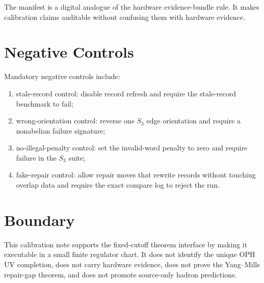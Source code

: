 \documentclass[11pt]{article}
\begin{document}
The manifest is a digital analogue of the hardware evidence-bundle rule. It makes calibration
claims auditable without confusing them with hardware evidence.

\section{Negative Controls}

Mandatory negative controls include:
\begin{enumerate}[leftmargin=2em]
\item stale-record control: disable record refresh and require the stale-record benchmark to fail;
\item wrong-orientation control: reverse one \(S_3\) edge orientation and require a nonabelian
failure signature;
\item no-illegal-penalty control: set the invalid-word penalty to zero and require failure in the
\(S_3\) suite;
\item fake-repair control: allow repair moves that rewrite records without touching overlap data
and require the exact compare log to reject the run.
\end{enumerate}

\section{Boundary}

This calibration note supports the fixed-cutoff theorem interface by making it executable in a
small finite regulator chart. It does not identify the unique OPH UV completion, does not carry
hardware evidence, does not prove the Yang--Mills repair-gap theorem, and does not promote
source-only hadron predictions.
\end{document}
